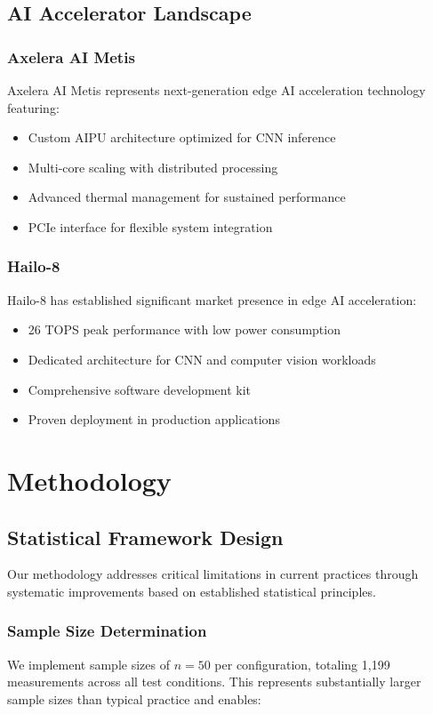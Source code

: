 \documentclass[manuscript]{acmart}
\begin{document}
\subsection{AI Accelerator Landscape}

\subsubsection{Axelera AI Metis}
Axelera AI Metis represents next-generation edge AI acceleration technology featuring:
\begin{itemize}
    \item Custom AIPU architecture optimized for CNN inference
    \item Multi-core scaling with distributed processing
    \item Advanced thermal management for sustained performance
    \item PCIe interface for flexible system integration
\end{itemize}

\subsubsection{Hailo-8}
Hailo-8 has established significant market presence in edge AI acceleration:
\begin{itemize}
    \item 26 TOPS peak performance with low power consumption
    \item Dedicated architecture for CNN and computer vision workloads
    \item Comprehensive software development kit
    \item Proven deployment in production applications
\end{itemize}

\section{Methodology}

\subsection{Statistical Framework Design}

Our methodology addresses critical limitations in current practices through systematic improvements based on established statistical principles.

\subsubsection{Sample Size Determination}
We implement sample sizes of $n = 50$ per configuration, totaling 1,199 measurements across all test conditions. This represents substantially larger sample sizes than typical practice and enables:
\end{document}
